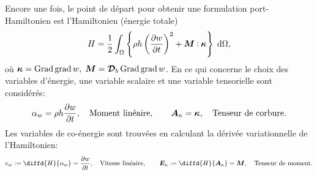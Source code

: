 Encore une fois, le point de départ pour obtenir une formulation port-Hamiltonien est l'Hamiltonien (énergie totale)
\begin{equation*}
H = \frac{1}{2} \int_{\Omega} \left\{\rho h \left(\diffp{w}{t} \right)^2 + \bm{M} \cddot \bm{\kappa}  \right\}  \d{\Omega},
\end{equation*}
où $ \bm{\kappa} = \operatorname*{Grad}\operatorname*{grad}{w}, \; \bm{M} = \bm{\mathcal{D}}_b \operatorname*{Grad}\operatorname*{grad}{w}$. En ce qui concerne le choix des variables d'énergie, une variable scalaire et une variable tensorielle sont considérés:
\begin{equation*}
\alpha_w = \rho h \diffp{w}{t}, \quad \text{Moment linéaire}, \qquad \bm{A}_{\kappa} = \bm{\kappa}, \quad \text{Tenseur de corbure}.	
\end{equation*}
Les variables de co-énergie sont trouvées en calculant la dérivée variationnelle de l'Hamiltonien:
\begin{equation*}
e_w := \diffd{H}{\alpha_w} = \diffp{w}{t}, \quad \text{Vitesse linéaire},  \qquad  \bm{E}_{\kappa} := \diffd{H}{\bm{A}_{\kappa}} = \bm{M}, \quad \text{Tenseur de moment}.
\end{equation*}

